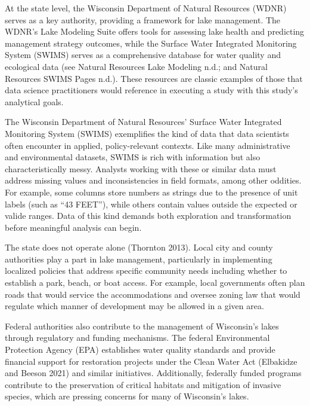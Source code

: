 \documentclass[
]{article}
\begin{document}
At the state level, the Wisconsin Department of Natural Resources (WDNR)
serves as a key authority, providing a framework for lake management.
The WDNR's Lake Modeling Suite offers tools for assessing lake health
and predicting management strategy outcomes, while the Surface Water
Integrated Monitoring System (SWIMS) serves as a comprehensive database
for water quality and ecological data (see Natural Resources Lake
Modeling n.d.; and Natural Resources SWIMS Pages n.d.). These resources
are classic examples of those that data science practitioners would
reference in executing a study with this study's analytical goals.

\begin{tcolorbox}[enhanced jigsaw, coltitle=black, toprule=.15mm, arc=.35mm, bottomtitle=1mm, opacityback=0, leftrule=.75mm, left=2mm, colframe=quarto-callout-note-color-frame, toptitle=1mm, titlerule=0mm, breakable, colbacktitle=quarto-callout-note-color!10!white, colback=white, bottomrule=.15mm, title=\textcolor{quarto-callout-note-color}{\faInfo}\hspace{0.5em}{Note}, rightrule=.15mm, opacitybacktitle=0.6]

The Wisconsin Department of Natural Resources' Surface Water Integrated
Monitoring System (SWIMS) exemplifies the kind of data that data
scientists often encounter in applied, policy-relevant contexts. Like
many administrative and environmental datasets, SWIMS is rich with
information but also characteristically messy. Analysts working with
these or similar data must address missing values and inconsistencies in
field formats, among other oddities. For example, some columns store
numbers as strings due to the presence of unit labels (such as ``43
FEET''), while others contain values outside the expected or valide
ranges. Data of this kind demands both exploration and transformation
before meaningful analysis can begin.

\end{tcolorbox}

The state does not operate alone (Thornton 2013). Local city and county
authorities play a part in lake management, particularly in implementing
localized policies that address specific community needs including
whether to establish a park, beach, or boat access. For example, local
governments often plan roads that would service the accommodations and
oversee zoning law that would regulate which manner of development may
be allowed in a given area.

Federal authorities also contribute to the management of Wisconsin's
lakes through regulatory and funding mechanisms. The federal
Environmental Protection Agency (EPA) establishes water quality
standards and provide financial support for restoration projects under
the Clean Water Act (Elbakidze and Beeson 2021) and similar initiatives.
Additionally, federally funded programs contribute to the preservation
of critical habitats and mitigation of invasive species, which are
pressing concerns for many of Wisconsin's lakes.
\end{document}
